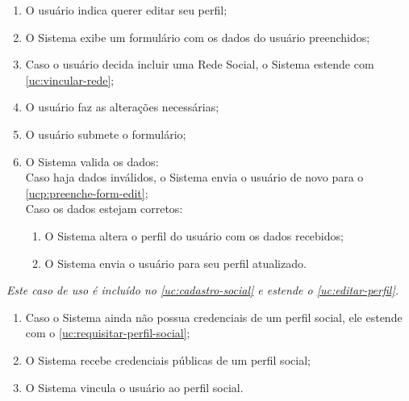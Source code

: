 \documentclass[12pt,a4paper,twoside,hyphens,english,brazil]{abntex2}
\begin{document}
{
\begin{enumerate}[itemsep=-1ex]
	\item O usuário indica querer editar seu perfil;
	\item O Sistema exibe um formulário com os dados do usuário preenchidos; \label{ucp:preenche-form-edit}
	\item Caso o usuário decida incluir uma Rede Social, o Sistema estende com \ref{uc:vincular-rede};
	\item O usuário faz as alterações necessárias;
	\item O usuário submete o formulário;
	\item O Sistema valida os dados:
		\\Caso haja dados inválidos, o Sistema envia o usuário de novo para o \autoref{ucp:preenche-form-edit};
		\\Caso os dados estejam corretos:
			\begin{enumerate}[itemsep=-1ex,topsep=-1ex]
				\item O Sistema altera o perfil do usuário com os dados recebidos;
				\item O Sistema envia o usuário para seu perfil atualizado.
			\end{enumerate}
\end{enumerate}

\emph{Este caso de uso é incluído no \ref{uc:cadastro-social} e estende o \ref{uc:editar-perfil}.}
\begin{enumerate}[itemsep=-1ex,topsep=-1ex]
	\item Caso o Sistema ainda não possua credenciais de um perfil social, ele estende com o \ref{uc:requisitar-perfil-social};
	\item O Sistema recebe credenciais públicas de um perfil social;
	\item O Sistema vincula o usuário ao perfil social.
\end{enumerate}

}
\end{document}

